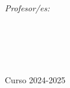 \documentclass[11pt, english, singlespacing, liststotoc, toctotoc, headsepline, chapterinoneline]{ClassThesis} %
\author{Luis Ardévol Mesa} %
\begin{document}
\frontmatter %

\pagestyle{plain} %


\begin{titlepage}
\begin{center}

\vspace*{.06\textheight}
{\scshape\LARGE \textcolor{mdtRed}{\univname}\par}\vspace{1.5cm} 
\textsc{}\\[0.5cm] 

\HRule{} \\[0.4cm]
{\huge \bfseries \ttitle\par}\vspace{0.4cm} 
\HRule{} \\[1.5cm] 
 
\begin{minipage}[t]{0.4\textwidth}
\begin{flushleft} \large
\emph{}\\
\textcolor{mdtRed}{\authorname} 
\end{flushleft}
\end{minipage}
\begin{minipage}[t]{0.4\textwidth}
\begin{flushright} \large
\emph{Profesor/es:} \\
\textcolor{mdtRed}{\supname} 
\end{flushright}
\end{minipage}\\[3cm]
 
\vspace{3cm}

\large \textit{\facname\\ \degreename}\\[0.8cm] 
 
\vspace{1cm}

{\large Curso 2024-2025}\\[4cm] %
 
\vfill
\end{center}
\end{titlepage}
\end{document}

